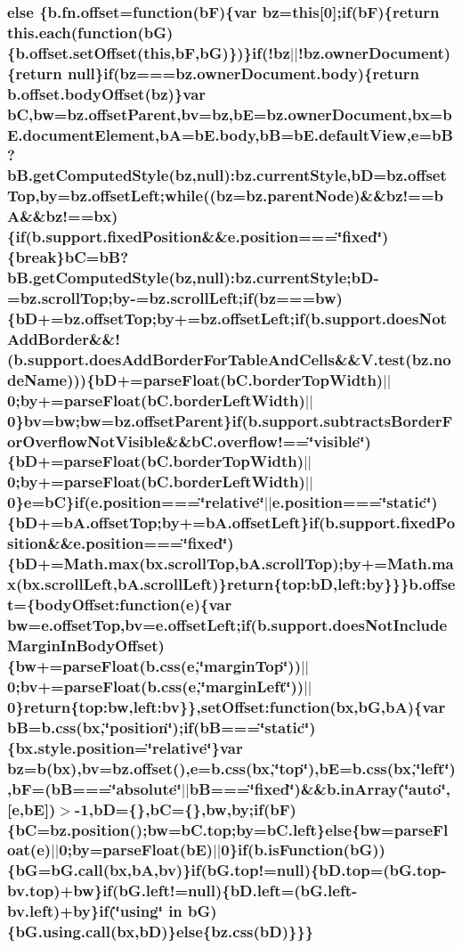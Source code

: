 \subsubsection[{else}]{\setlength{\rightskip}{0pt plus 5cm}else \{b.\-fn.\-offset=function(b\-F)\{var bz=this[0];{\bf if}(b\-F)\{return {\bf this.\-each}(function(b\-G)\{b.\-offset.\-set\-Offset(this,b\-F,b\-G)\})\}{\bf if}(!bz$\vert$$\vert$!bz.\-owner\-Document)\{return null\}{\bf if}(bz===bz.\-owner\-Document.\-body)\{return b.\-offset.\-body\-Offset(bz)\}var b\-C,bw=bz.\-offset\-Parent,bv=bz,b\-E=bz.\-owner\-Document,bx=b\-E.\-document\-Element,b\-A=b\-E.\-body,b\-B=b\-E.\-default\-View,e=b\-B?b\-B.\-get\-Computed\-Style(bz,null)\-:bz.\-current\-Style,b\-D=bz.\-offset\-Top,by=bz.\-offset\-Left;while((bz=bz.\-parent\-Node)\&\&bz!==b\-A\&\&bz!==bx)\{{\bf if}(b.\-support.\-fixed\-Position\&\&e.\-position===\char`\"{}fixed\char`\"{})\{break\}b\-C=b\-B?b\-B.\-get\-Computed\-Style(bz,null)\-:bz.\-current\-Style;b\-D-\/=bz.\-scroll\-Top;by-\/=bz.\-scroll\-Left;{\bf if}(bz===bw)\{b\-D+=bz.\-offset\-Top;by+=bz.\-offset\-Left;{\bf if}(b.\-support.\-does\-Not\-Add\-Border\&\&!(b.\-support.\-does\-Add\-Border\-For\-Table\-And\-Cells\&\&V.\-test(bz.\-node\-Name)))\{b\-D+=parse\-Float(b\-C.\-border\-Top\-Width)$\vert$$\vert$0;by+=parse\-Float(b\-C.\-border\-Left\-Width)$\vert$$\vert$0\}bv=bw;bw=bz.\-offset\-Parent\}{\bf if}(b.\-support.\-subtracts\-Border\-For\-Overflow\-Not\-Visible\&\&b\-C.\-overflow!==\char`\"{}visible\char`\"{})\{b\-D+=parse\-Float(b\-C.\-border\-Top\-Width)$\vert$$\vert$0;by+=parse\-Float(b\-C.\-border\-Left\-Width)$\vert$$\vert$0\}e=b\-C\}{\bf if}(e.\-position===\char`\"{}relative\char`\"{}$\vert$$\vert$e.\-position===\char`\"{}static\char`\"{})\{b\-D+=b\-A.\-offset\-Top;by+=b\-A.\-offset\-Left\}{\bf if}(b.\-support.\-fixed\-Position\&\&e.\-position===\char`\"{}fixed\char`\"{})\{b\-D+=Math.\-max(bx.\-scroll\-Top,b\-A.\-scroll\-Top);by+=Math.\-max(bx.\-scroll\-Left,b\-A.\-scroll\-Left)\}return\{top\-:b\-D,left\-:by\}\}\}b.\-offset=\{body\-Offset\-:function(e)\{var bw=e.\-offset\-Top,bv=e.\-offset\-Left;{\bf if}(b.\-support.\-does\-Not\-Include\-Margin\-In\-Body\-Offset)\{bw+=parse\-Float({\bf b.\-css}(e,\char`\"{}margin\-Top\char`\"{}))$\vert$$\vert$0;bv+=parse\-Float({\bf b.\-css}(e,\char`\"{}margin\-Left\char`\"{}))$\vert$$\vert$0\}return\{top\-:bw,left\-:bv\}\},set\-Offset\-:function(bx,b\-G,b\-A)\{var b\-B={\bf b.\-css}(bx,\char`\"{}position\char`\"{});if(b\-B===\char`\"{}static\char`\"{})\{bx.\-style.\-position=\char`\"{}relative\char`\"{}\}var bz={\bf b}(bx),bv=bz.\-offset(),e={\bf b.\-css}(bx,\char`\"{}top\char`\"{}),b\-E={\bf b.\-css}(bx,\char`\"{}left\char`\"{}),b\-F=(b\-B===\char`\"{}absolute\char`\"{}$\vert$$\vert$b\-B===\char`\"{}fixed\char`\"{})\&\&b.\-in\-Array(\char`\"{}auto\char`\"{},[e,b\-E])$>$-\/1,b\-D=\{\},b\-C=\{\},bw,by;{\bf if}(b\-F)\{b\-C=bz.\-position();bw=b\-C.\-top;by=b\-C.\-left\}else\{bw=parse\-Float(e)$\vert$$\vert$0;by=parse\-Float(b\-E)$\vert$$\vert$0\}{\bf if}(b.\-is\-Function(b\-G))\{b\-G=b\-G.\-call(bx,b\-A,bv)\}{\bf if}(b\-G.\-top!=null)\{b\-D.\-top=(b\-G.\-top-\/bv.\-top)+bw\}{\bf if}(b\-G.\-left!=null)\{b\-D.\-left=(b\-G.\-left-\/bv.\-left)+by\}{\bf if}(\char`\"{}using\char`\"{} in b\-G)\{b\-G.\-using.\-call(bx,b\-D)\}else\{{\bf bz.\-css}(b\-D)\}\}\}}\label{html_2jquery_8js_a0544c3fe466e421738dae463968b70ba}
